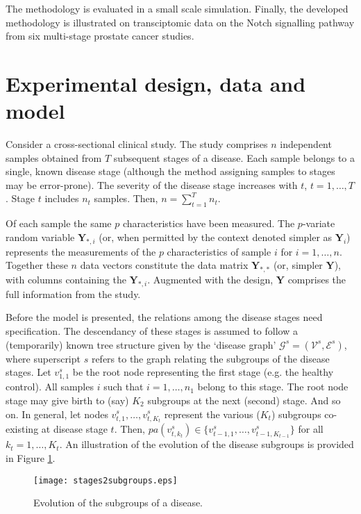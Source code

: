 \documentclass[10pt]{article}
\begin{document}
The methodology is evaluated in a small scale simulation. Finally, the developed methodology is illustrated on transciptomic data on the Notch signalling pathway from six multi-stage prostate cancer studies.






\section{Experimental design, data and model}
Consider a cross-sectional clinical study. The study comprises $n$ independent samples obtained from $T$ subsequent stages of a disease. Each sample belongs to a single, known disease stage (although the method assigning samples to stages may be error-prone). The severity of the disease stage increases with $t$, $t=1, \ldots, T$. Stage $t$ includes $n_t$ samples. Then, $n = \sum_{t=1}^T n_t$.

Of each sample the same $p$ characteristics have been measured. The $p$-variate random variable $\mathbf{Y}_{\ast, i}$ (or, when permitted by the context denoted simpler as $\mathbf{Y}_i$) represents the measurements of the $p$ characteristics of sample $i$ for $i=1, \ldots, n$. Together these $n$ data vectors constitute the data matrix $\mathbf{Y}_{\ast, \ast}$ (or, simpler $\mathbf{Y}$), with columns containing the $\mathbf{Y}_{\ast, i}$. Augmented with the design, $\mathbf{Y}$ comprises the full information from the study.

Before the model is presented, the relations among the disease stages need specification. The descendancy of these stages is assumed to follow a (temporarily) known tree structure given by the `disease graph' $\mathcal{G}^s = (\mathcal{V}^s, \mathcal{E}^s)$, where superscript $s$ refers to the graph relating the subgroups of the disease stages. Let $v_{1,1}^s$ be the root node representing the first stage (e.g. the healthy control). All samples $i$ such that $i = 1, \ldots, n_1$ belong to this stage. The root node stage may give birth to (say) $K_2$ subgroups at the next (second) stage. And so on. In general, let nodes $v_{t,1}^s, \ldots, v_{t, K_t}^s$ represent the various ($K_t$) subgroups co-existing at disease stage $t$. Then, $pa(v_{t, k_t}^s) \in \{ v_{t-1, 1}^s, \ldots, v_{t-1, K_{t-1}}^s \}$ for all $k_t = 1, \ldots, K_t$. An illustration of the evolution of the disease subgroups is provided in Figure \ref{fig.diseaseEvolution}.

\begin{figure}[h!]
\begin{center}
\texttt{[image: stages2subgroups.eps]}
\end{center}
\caption{Evolution of the subgroups of a disease.}
\label{fig.diseaseEvolution}
\end{figure}
\end{document}
